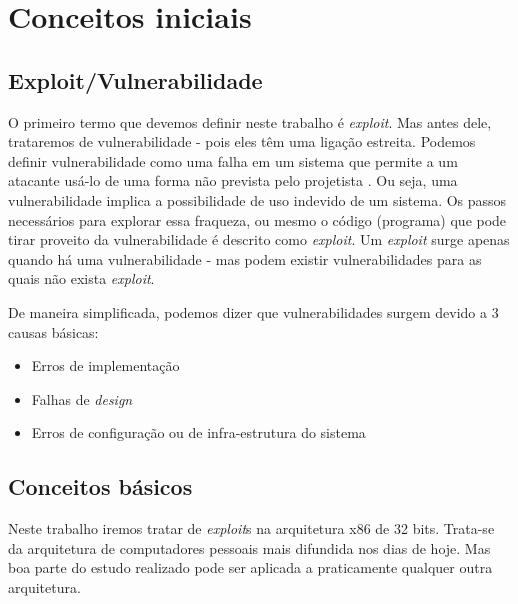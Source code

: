 
\chapter{Conceitos iniciais}
\label{chap:conceitos_iniciais}

	\section{Exploit/Vulnerabilidade}
	O primeiro termo que devemos definir neste trabalho é \textsl{exploit}. Mas antes dele,
	trataremos de vulnerabilidade - pois eles têm uma ligação estreita.
	Podemos definir vulnerabilidade como uma falha em um sistema que permite
	a um atacante usá-lo de uma forma não prevista pelo projetista \cite{Anley2007}.
	Ou seja, uma vulnerabilidade implica a possibilidade de uso indevido de um sistema.
	Os passos necessários para explorar essa fraqueza, ou mesmo o código (programa) que pode tirar
	proveito da vulnerabilidade é descrito como \textsl{exploit}.
	Um \textsl{exploit} surge apenas quando há uma vulnerabilidade - mas podem existir
	vulnerabilidades para as quais não exista \textsl{exploit}.

	De maneira simplificada, podemos dizer que vulnerabilidades surgem devido a 3 causas básicas:
	\begin{itemize}
		\item{Erros de implementação}
		\item{Falhas de \textsl{design}}
		\item{Erros de configuração ou de infra-estrutura do sistema}
	\end{itemize}


	\section{Conceitos básicos}
		Neste trabalho iremos tratar de \textsl{exploit}s na arquitetura x86 de 32 bits. 
		Trata-se da arquitetura de computadores
		pessoais mais difundida nos dias de hoje. Mas boa parte do estudo realizado pode ser aplicada
		a praticamente qualquer outra arquitetura.

